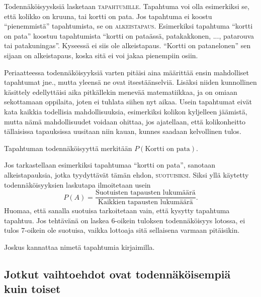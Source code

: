 \documentclass[12pt,leqno,a4paper,oneside]{amsart}
\theoremstyle{definition}
\theoremstyle{remark}
\numberwithin{equation}{section}
\begin{document}
\hspace{10pt}

Todennäköisyysksiä lasketaan \textsc{tapahtumille}. Tapahtuma voi olla esi\-merkiksi se, että kolikko on kruuna, tai kortti on pata.
Jos tapahtuma ei koostu ``pienemmistä'' tapahtumista, se on \textsc{alkeistapaus}. Esi\-merkiksi tapahtuma ``kortti on pata'' koostuu tapahtumista
``kortti on pataässä, patakakkonen, ..., patarouva tai patakuningas''. Kyseessä ei siis ole alkeistapaus. ``Kortti on patanelonen'' sen sijaan on 
alkeistapaus, koska sitä ei voi jakaa pienempiin osiin.

Periaatteessa todennäköisyyksiä varten pitäisi aina määrittää ensin mahdolliset tapahtumat jne., mutta yleensä ne ovat itsestäänselviä. Lisäksi
niiden kunnollinen käsittely edellyttäisi aika pitkällekin menevää matematiikkaa, ja on omiaan sekottamaan oppilaita, joten ei tuhlata siihen nyt aikaa.
Usein tapahtumat eivät kata kaikkia todellisia mahdollisuuksia, esimerkiksi kolikon kyljelleen jäämistä, mutta nämä mahdollisuudet voidaan ohittaa, jos
ajatellaan, että kolikonheitto tällaisissa tapauksissa uusitaan niin kauan, kunnes saadaan kelvollinen tulos.

Tapahtuman todennäköisyyttä merkitään $P(\text{Kortti on pata}).$ 

Jos tarkastellaan esimerkiksi tapahtumaa ``kortti on pata'', sanotaan alkeistapauksia, jotka tyydyttävät tämän ehdon, \textsc{suotuisiksi}. Siksi yllä käytetty
todennäköisyyksien laskutapa ilmoitetaan usein
$$P(A) = \frac{\text{Suotuisten tapausten lukumäärä}}{\text{Kaikkien tapausten lukumäärä}} .$$
Huomaa, että sanalla suotuisa tarkoitetaan vain, että kysytty tapahtuma tapahtuu. Jos tehtävänä on laskea 6-oikein tuloksen todennäköisyys lotossa,
ei tulos 7-oikein ole suotuisa, vaikka lottoaja sitä sellaisena varmaan pitäisikin.

Joskus kannattaa nimetä tapahtumia kirjaimilla.


\subsection{Jotkut vaihtoehdot ovat todennäköisempiä kuin toiset}
\end{document}
